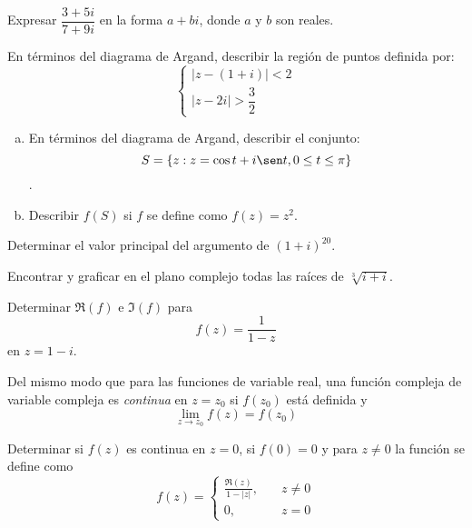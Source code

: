 \documentclass[11pt]{article}
\begin{document}
\begin{question} %
    Expresar $\dfrac{3 + 5 i}{7 + 9 i}$ en la forma $a + bi$, donde $a$ y $b$ son reales.
\end{question}

\begin{question} %
    En términos del diagrama de Argand, describir la región de puntos definida por:
    \[ \begin{cases}
        |z - (1 + i)| < 2 \\
        |z - 2 i| > \dfrac{3}{2}
       \end{cases}
\]
\end{question}

\begin{question} %
    \begin{enumerate}[a)]
     \item En términos del diagrama de Argand, describir el conjunto:
     \[ S = \{ z:z = \cos t + i \sen t, 0 \leq t \leq \pi \} \].
     \item Describir $f(S)$ si $f$ se define como $f(z) = z^2$.
    \end{enumerate}
\end{question}

\begin{question} %
 Determinar el valor principal del argumento de $(1 + i)^{20}$.
\end{question}

\begin{question} %
 Encontrar y graficar en el plano complejo todas las raíces de $\sqrt[3]{i + i}$.
\end{question}

\begin{question} %
    Determinar $\Re(f)$ e $\Im(f)$ para
    \[ f(z ) = \frac{1}{1 - z} \]
    en $z = 1 - i$.
\end{question}

\begin{question} %
    Del mismo modo que para las funciones de variable real, una función compleja de variable compleja es \textit{continua} en $z = z_0$ si $f(z_0)$ está definida y
    \[ \lim_{z \rightarrow z_0} f(z) = f(z_0) \]
    
    Determinar si $f(z)$ es continua en $z = 0$, si $f(0) = 0$ y para $z \neq 0$ la función se define como
    \[ f(z) = \begin{cases}
                \frac{\Re(z)}{1 - |z|}, &\quad z \neq 0 \\
                0, &\quad z = 0
              \end{cases} \]
 \end{question}
\end{document}
